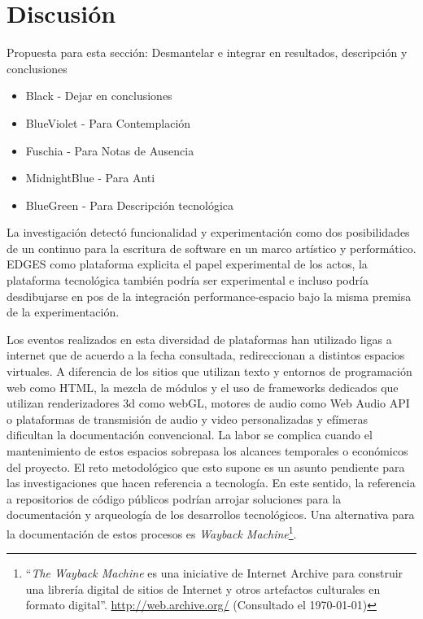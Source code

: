 
\section*{Discusión}

Propuesta para esta sección: Desmantelar e integrar en resultados, descripción y conclusiones

\begin{itemize}

  \color{black}

\item {Black - Dejar en conclusiones}

  \color{BlueViolet}

\item BlueViolet - Para Contemplación 
  
  \color{Fuchsia}
  
\item Fuschia - Para Notas de Ausencia

  \color{MidnightBlue}

\item MidnightBlue - Para Anti

  \color{BlueGreen}

\item BlueGreen - Para Descripción tecnológica
  
\end{itemize}

\color{Fuchsia}

La investigación detectó funcionalidad y experimentación como dos posibilidades de un continuo para la escritura de software en un marco artístico y performático. EDGES como plataforma explicita el papel experimental de los actos, la plataforma tecnológica también podría ser experimental e incluso podría desdibujarse en pos de la integración performance-espacio bajo la misma premisa de la experimentación.

\color{black}

Los eventos realizados en esta diversidad de plataformas han utilizado ligas a internet que de acuerdo a la fecha consultada, redireccionan a distintos espacios virtuales. A diferencia de los sitios que utilizan texto y entornos de programación web como HTML, la mezcla de módulos y el uso de frameworks dedicados que utilizan renderizadores 3d como webGL, motores de audio como Web Audio API o plataformas de transmisión de audio y video personalizadas y efímeras dificultan la documentación convencional. La labor se complica cuando el mantenimiento de estos espacios sobrepasa los alcances temporales o económicos del proyecto. El reto metodológico que esto supone es un asunto pendiente para las investigaciones que hacen referencia a tecnología. En este sentido, la referencia a repositorios de código públicos podrían arrojar soluciones para la documentación y arqueología de los desarrollos tecnológicos. Una alternativa para la documentación de estos procesos es \textit{Wayback Machine}\footnote{``\textit{The Wayback Machine} es una iniciative de Internet Archive para construir una librería digital de sitios de Internet y otros artefactos culturales en formato digital''. \url{http://web.archive.org/} (Consultado el \today)}. 

